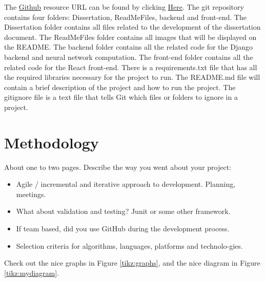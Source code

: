 The \href{https://github.com/MarkReillyGMIT/AppliedProject}{Github} resource URL can be found by clicking \href{https://github.com/MarkReillyGMIT/AppliedProject}{Here}. The git repository contains four folders: Dissertation, ReadMeFiles, backend and front-end. The Dissertation folder contains all files related to the development of the dissertation document. The ReadMeFiles folder contains all images that will be displayed on the README. The backend folder contains all the related code for the Django backend and neural network computation. The front-end folder contains all the related code for the React front-end. There is a requirements.txt file that has all the required libraries necessary for the project to run. The README.md file will contain a brief description of the project and how to run the project. The gitignore file is a text file that tells Git which files or folders to ignore in a project. 


\chapter{Methodology}
About one to two pages.
Describe the way you went about your project:
\begin{itemize}
\item Agile / incremental and iterative approach to development. Planning, meetings.
\item What about validation and testing? Junit or some other framework.
\item If team based, did you use GitHub during the development process.
\item Selection criteria for algorithms, languages, platforms and technolo-gies.
\end{itemize}
Check out the nice graphs in Figure \ref{tikz:graphs}, and the nice diagram in Figure \ref{tikz:mydiagram}.

